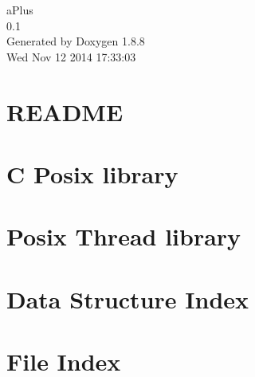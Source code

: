 \documentclass[twoside]{book}
\newcommand{\+}{\discretionary{\mbox{\scriptsize$\hookleftarrow$}}{}{}}
\newcommand{\clearemptydoublepage}{%
  \newpage{\pagestyle{empty}\cleardoublepage}%
}
\begin{document}
\hypersetup{pageanchor=false,
             bookmarks=true,
             bookmarksnumbered=true,
             pdfencoding=unicode
            }
\begin{titlepage}
\vspace*{7cm}
\begin{center}%
{\Large a\+Plus \\[1ex]\large 0.\+1 }\\
\vspace*{1cm}
{\large Generated by Doxygen 1.8.8}\\
\vspace*{0.5cm}
{\small Wed Nov 12 2014 17:33:03}\\
\end{center}
\end{titlepage}
\clearemptydoublepage
\tableofcontents
\clearemptydoublepage
{}
\hypersetup{pageanchor=true}

\chapter{R\+E\+A\+D\+M\+E}
\label{md_README}
\hypertarget{md_README}{}

\chapter{C Posix library}
\label{md_usr_src_libposix_README}
\hypertarget{md_usr_src_libposix_README}{}

\chapter{Posix Thread library}
\label{md_usr_src_libpthread_README}
\hypertarget{md_usr_src_libpthread_README}{}

\chapter{Data Structure Index}

\chapter{File Index}

\end{document}
